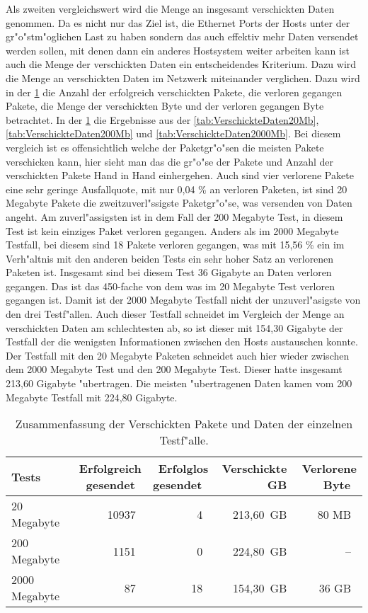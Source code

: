 Als zweiten vergleichswert wird die Menge an insgesamt verschickten Daten genommen. %
Da es nicht nur das Ziel ist, die Ethernet Ports der Hosts unter der gr"o"stm"oglichen %
Last zu haben sondern das auch effektiv mehr Daten versendet werden sollen, mit denen dann ein anderes %
Hostsystem weiter arbeiten kann ist auch die Menge der verschickten Daten ein entscheidendes Kriterium. Dazu wird die Menge an %
verschickten Daten im Netzwerk miteinander verglichen. Dazu wird in der \cref{tab:compPackages} %
die Anzahl der erfolgreich verschickten Pakete, die verloren gegangen Pakete, die Menge der verschickten %
Byte und der verloren gegangen Byte betrachtet. In der \cref{tab:compPackages} die Ergebnisse aus der %
\cref{tab:VerschickteDaten20Mb}, \cref{tab:VerschickteDaten200Mb} und \cref{tab:VerschickteDaten2000Mb}. %
Bei diesem vergleich ist es offensichtlich welche der Paketgr"o"sen die meisten Pakete verschicken kann, %
hier sieht man das die gr"o"se der Pakete und Anzahl der verschickten Pakete Hand in Hand einhergehen. %
Auch sind vier verlorene Pakete eine sehr geringe Ausfallquote, mit nur 0,04 \% an verloren Paketen, %
ist sind 20 Megabyte Pakete die zweitzuverl"ssigste Paketgr"o"se, was versenden von Daten angeht. %
Am zuverl"assigsten ist in dem Fall der 200 Megabyte Test, in diesem Test ist kein einziges Paket %
verloren gegangen. Anders als im 2000 Megabyte Testfall, bei diesem sind 18 Pakete verloren gegangen, %
was mit 15,56 \% ein im Verh"altnis mit den anderen beiden Tests ein sehr hoher Satz an verlorenen Paketen %
ist. Insgesamt sind bei diesem Test 36 Gigabyte an Daten verloren gegangen. Das ist das 450-fache von dem %
was im 20 Megabyte Test verloren gegangen ist. Damit ist der 2000 Megabyte Testfall nicht der unzuverl"asigste %
von den drei Testf"allen. Auch dieser Testfall schneidet im Vergleich der Menge an verschickten Daten am %
schlechtesten ab, so ist dieser mit 154,30 Gigabyte der Testfall der die wenigsten Informationen %
zwischen den Hosts austauschen konnte. Der Testfall mit den 20 Megabyte Paketen schneidet auch hier %
wieder zwischen dem 2000 Megabyte Test und den 200 Megabyte Test. Dieser hatte insgesamt 213,60 %
Gigabyte "ubertragen. Die meisten "ubertragenen Daten kamen vom 200 Megabyte Testfall mit 224,80 Gigabyte. %

\begin{table}
\centering
\begin{tabular}{l%
 r<{\,}%
   r<{\,}%
r<{\,GB}%
r<{\,}%
}
Tests				& Erfolgreich gesendet			& Erfolglos gesendet 	& Verschickte 	& Verlorene Byte 	\\
\hline
\hspace{8pt} 20 Megabyte  	& 10937					& 4 			& 213,60	& 80 MB		\\
\hspace{6pt}200 Megabyte  	& 1151					& 0			& 224,80	& --		\\
2000 Megabyte	  		& 87					& 18			& 154,30	& 36 GB	\\
\end{tabular}
\caption{Zusammenfassung der Verschickten Pakete und Daten der einzelnen Testf"alle.}
\label{tab:compPackages}
\end{table}

